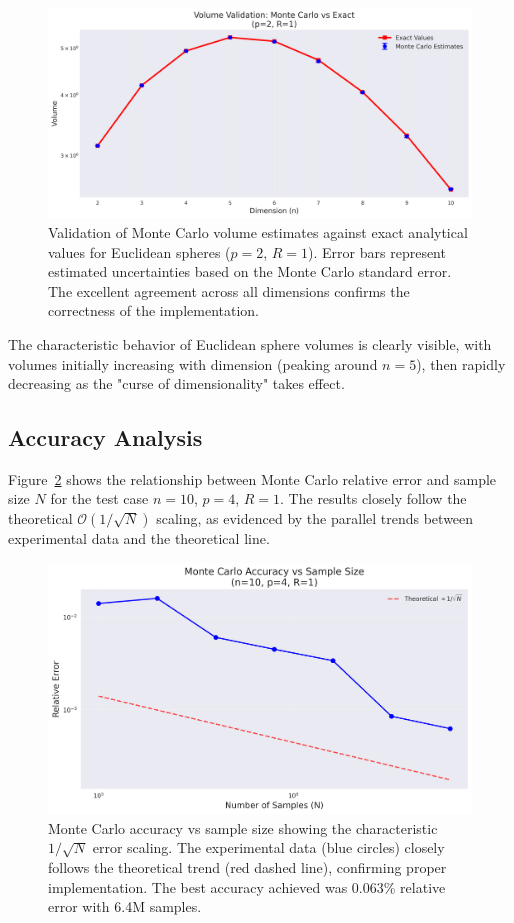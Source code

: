 \documentclass[11pt,a4paper]{article}
\begin{document}
	\begin{figure}[H]
		\centering
		\includegraphics[width=0.9\linewidth]{../plots/validation_comparison.png}
		\caption{Validation of Monte Carlo volume estimates against exact analytical values for Euclidean spheres ($p = 2$, $R = 1$). Error bars represent estimated uncertainties based on the Monte Carlo standard error. The excellent agreement across all dimensions confirms the correctness of the implementation.}
		\label{fig:validation}
	\end{figure}
	
	The characteristic behavior of Euclidean sphere volumes is clearly visible, with volumes initially increasing with dimension (peaking around $n = 5$), then rapidly decreasing as the "curse of dimensionality" takes effect.
	
	\subsection{Accuracy Analysis}
	
	Figure~\ref{fig:accuracy} shows the relationship between Monte Carlo relative error and sample size $N$ for the test case $n = 10$, $p = 4$, $R = 1$. The results closely follow the theoretical $\mathcal{O}(1/\sqrt{N})$ scaling, as evidenced by the parallel trends between experimental data and the theoretical line.
	
	\begin{figure}[H]
		\centering
		\includegraphics[width=0.9\linewidth]{../plots/accuracy_vs_n.png}
		\caption{Monte Carlo accuracy vs sample size showing the characteristic $1/\sqrt{N}$ error scaling. The experimental data (blue circles) closely follows the theoretical trend (red dashed line), confirming proper implementation. The best accuracy achieved was 0.063\% relative error with 6.4M samples.}
		\label{fig:accuracy}
	\end{figure}
	
\end{document}

